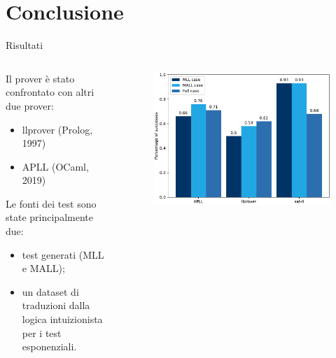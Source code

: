 \documentclass{beamer}
\begin{document}
\section{Conclusione}
\begin{frame}{Risultati}
	\begin{columns}
		\begin{column}{.5\textwidth}
			Il prover è stato confrontato con altri due prover:
			\begin{itemize}
				\item llprover (Prolog, 1997)
				\item APLL (OCaml, 2019)
			\end{itemize}
			Le fonti dei test sono state principalmente due:
			\begin{itemize}
				\item test generati (MLL e MALL);
				\item un dataset di traduzioni dalla logica intuizionista per i test esponenziali.
			\end{itemize}
		\end{column}
		\begin{column}{.5\textwidth}
			\begin{figure}[H]
				\centering
				\includegraphics[scale=.4]{images/graph}
			\end{figure}
		\end{column}
	\end{columns}
\end{frame}
\end{document}
